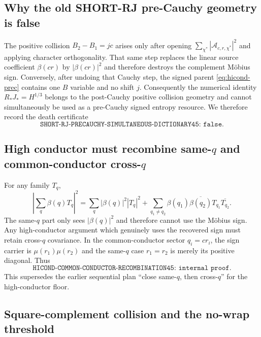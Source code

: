 \documentclass[11pt]{article}
\theoremstyle{definition}
\newcommand{\1}{\mathbf 1}
\begin{document}
\subsection{Why the old SHORT-RJ pre-Cauchy geometry is false}

The positive collision $B_2-B_1=jc$ arises only after opening
$\sum_{\chi^*}|\mathcal A_{c,r,\chi^*}|^2$ and applying character
orthogonality.  That same step replaces the linear source coefficient
$\beta(cr)$ by $|\beta(cr)|^2$ and therefore destroys the complement M\"obius
sign.  Conversely, after undoing that Cauchy step, the signed parent
\eqref{eq:hicond-prec} contains one $B$ variable and no shift $j$.
Consequently the numerical identity $R_*J_*=H^{1/3}$ belongs to the
post-Cauchy positive collision geometry and cannot simultaneously be used as a
pre-Cauchy signed entropy resource.  We therefore record the death
certificate
\[
 \boxed{\texttt{SHORT-RJ-PRECAUCHY-SIMULTANEOUS-DICTIONARY45: false}.}
\]

\subsection{High conductor must recombine same-$q$ and common-conductor cross-$q$}

For any family $T_q$,
\[
 \left|\sum_q\beta(q)T_q\right|^2
 =
 \sum_q|\beta(q)|^2|T_q|^2
 +
 \sum_{q_1\ne q_2}
   \beta(q_1)\overline{\beta(q_2)}
   T_{q_1}\overline{T_{q_2}}.
\]
The same-$q$ part only sees $|\beta(q)|^2$ and therefore cannot use the
M\"obius sign.  Any high-conductor argument which genuinely uses the recovered
sign must retain cross-$q$ covariance.  In the common-conductor sector
$q_i=cr_i$, the sign carrier is $\mu(r_1)\mu(r_2)$ and the same-$q$ case
$r_1=r_2$ is merely its positive diagonal.  Thus
\[
 \boxed{\texttt{HICOND-COMMON-CONDUCTOR-RECOMBINATION45: internal proof}.}
\]
This supersedes the earlier sequential plan ``close same-$q$, then cross-$q$''
for the high-conductor floor.

\subsection{Square-complement collision and the no-wrap threshold}
\end{document}
